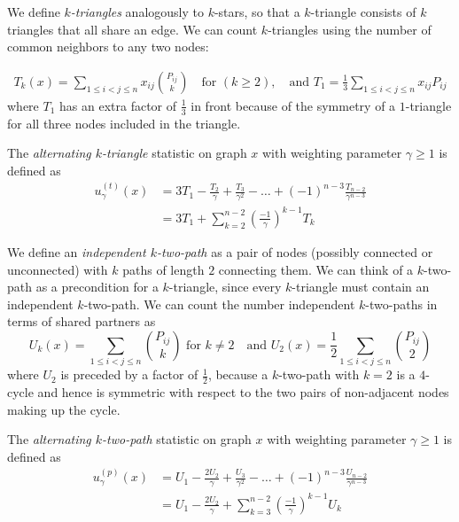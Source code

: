 We define \emph{$k$-triangles} analogously to $k$-stars, so that a $k$-triangle consists of $k$ triangles that all share an edge. We can count $k$-triangles using the number of common neighbors to any two nodes:

\begin{align}
\label{eq:k-triangle}
T_k(x) = \sum_{1 \leq i < j \leq n} x_{ij} \binom{P_{ij}}{k} \quad \text{for } (k \geq 2), \quad \text{and } T_1 = \frac{1}{3} \sum_{1 \leq i < j \leq n} x_{ij} P_{ij}
\end{align}
where $T_1$ has an extra factor of $\frac{1}{3}$ in front because of the symmetry of a $1$-triangle for all three nodes included in the triangle.

\begin{definition}
	\label{def:altktri}
	The \emph{alternating $k$-triangle} statistic on graph $x$ with weighting parameter $\gamma \geq 1$ is defined as
	\begin{align*}
	u^{(t)}_\gamma(x) & = 3T_1 - \frac{T_2}{\gamma} + \frac{T_3}{\gamma^2} - \dots + (-1)^{n-3} \frac{T_{n-2}}{\gamma^{n-3}} \\
	&  = 3 T_1 + \sum_{k = 2}^{n-2} \left(\frac{-1}{\gamma}\right)^{k-1} T_k
	\end{align*}
\end{definition}

We define an \emph{independent $k$-two-path} as a pair of nodes (possibly connected or unconnected) with $k$ paths of length $2$ connecting them. We can think of a $k$-two-path as a precondition for a $k$-triangle, since every $k$-triangle must contain an independent $k$-two-path. We can count the number independent $k$-two-paths in terms of shared partners as 
\begin{equation}
\label{eq:k-two-path}
U_k(x) = \sum_{1 \leq i < j \leq n} \binom{P_{ij}}{k} \text{ for } k \not= 2 \quad \text{and } U_2(x) = \frac{1}{2} \sum_{1 \leq i < j \leq n} \binom{P_{ij}}{2}
\end{equation}
where $U_2$ is preceded by a factor of $\frac{1}{2}$, because a $k$-two-path with $k=2$ is a $4$-cycle and hence is symmetric with respect to the two pairs of non-adjacent nodes making up the cycle.

\begin{definition}
	\label{def:altktwopath}
	The \emph{alternating $k$-two-path} statistic on graph $x$ with weighting parameter $\gamma \geq 1$ is defined as 
	\begin{align*}
	u^{(p)}_\gamma(x) & = U_1 - \frac{2 U_2}{\gamma}   + \frac{U_3}{\gamma^2} - \dots + (-1)^{n-3} \frac{U_{n-2}}{\gamma^{n-3}} \\
	&  = U_1 - \frac{2 U_2}{\gamma} + \sum_{k = 3}^{n-2} \left(\frac{-1}{\gamma}\right)^{k-1} U_k
	\end{align*}
\end{definition}

